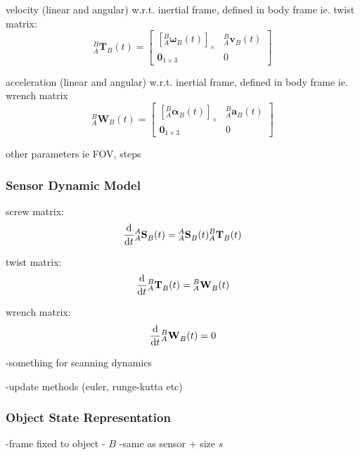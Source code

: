 		velocity (linear and angular) w.r.t. inertial frame, defined in body frame ie. twist matrix:
		\begin{equation}
				{^{B}_{A}\mathbf{T}^{}_{B}(t)} = 
				\begin{bmatrix}
		  {[^{B}_{A}\mathbf{\omega}^{}_{B}(t)]_\times} 	& 	^{B}_{A}\mathbf{v}^{}_{B}(t)\\
		  \textbf{0}_{1 \times 3} & 0						  
				\end{bmatrix}
		\end{equation}
				
		acceleration (linear and angular) w.r.t. inertial frame, defined in body frame ie. wrench matrix
		\begin{equation}
				{^{B}_{A}\mathbf{W}^{}_{B}(t)} = 
				\begin{bmatrix}
				  {[^{B}_{A}\mathbf{\alpha}^{}_{B}(t)]_\times} 	& 	^{B}_{A}\mathbf{a}^{}_{B}(t)\\
				  \textbf{0}_{1 \times 3} & 0						  
				\end{bmatrix}
		\end{equation}
		
		other parameters ie FOV, steps
				
	\subsubsection{Sensor Dynamic Model}
		screw matrix:
		\begin{equation}
			{\frac{\textnormal{d}}{\textnormal{d}t}} {^{A}_{A}\mathbf{S}^{}_{B}(t)} ={^{A}_{A}\mathbf{S}^{}_{B}(t)} {^{B}_{A}\mathbf{T}^{}_{B}(t)}
		\end{equation}		
		
		twist matrix:
		\begin{equation}
			{\frac{\textnormal{d}}{\textnormal{d}t}} {^{B}_{A}\mathbf{T}^{}_{B}(t)} = {^{B}_{A}\mathbf{W}^{}_{B}(t)}
		\end{equation}		
		
		wrench matrix:
		\begin{equation}
			{\frac{\textnormal{d}}{\textnormal{d}t}} {^{B}_{A}\mathbf{W}^{}_{B}(t)}=0			
		\end{equation}
		
		-something for scanning dynamics
		
		-update methods (euler, runge-kutta etc)
		
	\subsubsection{Object State Representation}
		-frame fixed to object - $B$
		-same as sensor + size $s$
